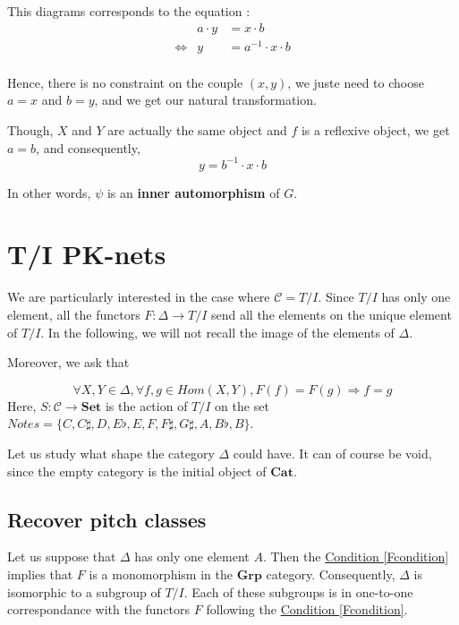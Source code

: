\documentclass{report}
\begin{document}
This diagrams corresponds to the equation :
\begin{eqnarray*}
    &a\cdot y &= x \cdot b\\
    \Leftrightarrow & y &= a^{-1}\cdot x\cdot  b\\
\end{eqnarray*}

Hence, there is no constraint on the couple $(x,y)$, we juste need to choose $a = x$ and $b = y$, and we get our natural transformation.

Though, $X$ and $Y$ are actually the same object and $f$ is a reflexive object, we get $a = b$, and consequently,
$$y = b^{-1}\cdot x \cdot b $$

In other words, $\psi$ is an \textbf{inner automorphism} of $G$.


\section{T/I PK-nets}

We are particularly interested in the case where $\mathcal{C} = T/I$. Since $T/I$ has only one element, all the functors $F:\Delta \rightarrow T/I$ send all the elements on the unique element of $T/I$. In the following, we will not recall the image of the elements of $\Delta$.

Moreover, we ask that

\begin{equation}
    \forall X, Y\in \Delta, \forall f, g \in Hom(X,Y), F(f) = F(g) \Rightarrow f = g
    \label{Fcondition}
\end{equation}
Here, $S:\mathcal{C}\rightarrow \textbf{Set}$ is the action of $T/I$ on the set $Notes = \{C,C\sharp,D,E\flat,E,F,F\sharp,G\sharp,A,B\flat,B\}$.

Let us study what shape the category $\Delta$ could have. It can of course be void, since the empty category is the initial object of $\textbf{Cat}$.

\subsection{Recover pitch classes}
Let us suppose that $\Delta$ has only one element $A$. Then the \hyperref[Fcondition]{Condition \ref*{Fcondition}} implies that $F$ is a monomorphism in the $\textbf{Grp}$ category. Consequently, $\Delta$ is isomorphic to a subgroup of $T/I$. Each of these subgroups is in one-to-one correspondance with the functors $F$ following the \hyperref[Fcondition]{Condition \ref*{Fcondition}}.
\end{document}

